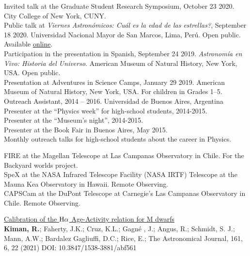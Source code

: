 \documentclass[10pt]{cv}
\newcommand\tab[1][1cm]{\hspace*{#1}}
\begin{document}
\begin{llist}

Invited talk at the Graduate Student Research Symposium, October 23 2020. City College of New York, CUNY.	\\
Public talk at \textit{Viernes Astron\'omicos: Cu\'al es la edad de las estrellas?}, September 18 2020. Universidad Nacional Mayor de San Marcos, Lima, Per\'u. Open public. Available \href{https://www.youtube.com/watch?v=QOlgG1b41hU&ab_channel=AstronomySanMarcos}{online}.\\
Participation in the presentation in Spanish, September 24 2019. \textit{Astronom\'ia en Vivo: Historia del Universo}. American Museum of Natural History, New York, USA. Open public.\\
Presentation at Adventures in Science Camps, January 29 2019. American Museum of Natural History, New York, USA. For children in Grades 1--5.\\
Outreach Assistant, 2014 -- 2016. Universidad de Buenos Aires, Argentina\\
\tab Presenter at the ``Physics week'' for high-school students, 2014-2015.\\
\tab Presenter at the ``­Museum's night'', 2014-2015.\\
\tab Presenter at the Book Fair in Buenos Aires, May 2015.\\
\tab Monthly outreach talks for high-school students about the career in Physics.


FIRE at the Magellan Telescope at Las Campanas Observatory
 in Chile. For the Backyard worlds project. \\
SpeX at the NASA Infrared Telescope Facility (NASA IRTF) 	
Telescope at the Mauna Kea Observatory in Hawaii. Remote Observing. \\
CAPSCam at the DuPont Telescope	
at Carnegie's Las Campanas Observatory in Chile. Remote Observing.




\href{https://ui.adsabs.harvard.edu/abs/2021AJ....161..277K/abstract}{Calibration of the ${\rm H}\alpha$ Age-Activity relation for M dwarfs}\\
\textbf{Kiman, R.}; Faherty, J.K.; Cruz, K.L.; Gagn\'e , J.; Angus, R.; Schmidt, S. J.; Mann, A.W.; Bardalez Gagliuffi, D.C.; Rice, E.; The Astronomical Journal, 161, 6, 22 (2021) DOI: 10.3847/1538-3881/abf561



\end{llist}
\end{document}
